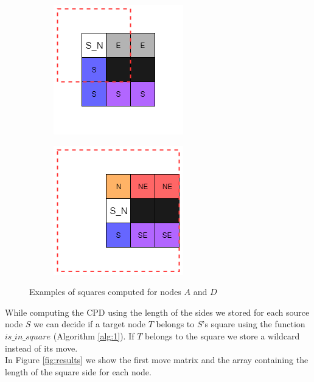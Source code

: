 \begin{figure}[h]
      \centering
      \begin{subfigure}{.35\columnwidth}
      \centering
      \includegraphics[width=.6\columnwidth]{square_nodeA.png}
        \caption{}
        \label{fig:example_1}
      \end{subfigure}%
      \begin{subfigure}{.35\columnwidth}
      \includegraphics[width=.6\columnwidth]{./square_nodeD.png}
      \centering
        \caption{}
        \label{fig:example_2}
      \end{subfigure}
      \caption{\small Examples of squares computed for nodes $A$ and $D$}
      \label{fig:example}
    \end{figure}

While computing the CPD using the length of the sides we stored for each source node $S$ we can decide if a target node $T$ belongs to $S$'s square using the function $is\_in\_square$ (Algorithm \ref{alg:1}). If $T$ belongs to the square we store a wildcard instead of its move.\\
In Figure \ref{fig:results} we show the first move matrix and the array containing the length of the square side for each node.

